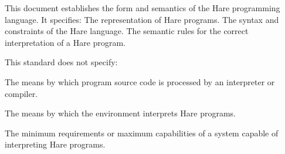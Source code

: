
\specitem
This document establishes the form and semantics of the Hare programming
language. It specifies:
\specsubitem The representation of Hare programs.
\specsubitem The syntax and constraints of the Hare language.
\specsubitem The semantic rules for the correct interpretation of a Hare program.

\specitem
This standard does not specify:

\specsubitem
The means by which program source code is processed by an interpreter or
compiler.


\specsubitem The means by which the environment interprets Hare programs.

\specsubitem
The minimum requirements or maximum capabilities of a system capable of
interpreting Hare programs.
